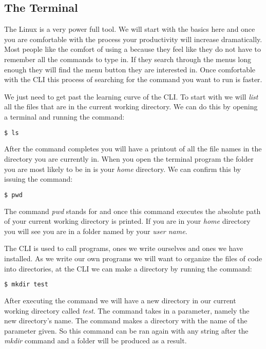 \subsection{The Terminal}
	
The Linux  is a very power full tool. We will start with the basics here and once you are comfortable with the process your productivity will increase dramatically. Most people like the comfort of using a  because they feel like they do not have to remember all the commands to type in. If they search through the menus long enough they will find the menu button they are interested in. Once comfortable with the \ac{CLI} this process of searching for the command you want to run is faster. 

We just need to get past the learning curve of the \ac{CLI}. To start with we will \emph{list} all the files that are in the current working directory. We can do this by opening a terminal and running the command:

\begin{lstlisting}[language=bash]
    $ ls
\end{lstlisting}	
	
After the command completes you will have a printout of all the file names in the directory you are currently in. When you open the terminal program the folder you are most likely to be in is your \emph{home} directory. We can confirm this by issuing the command:

\begin{lstlisting}[language=bash]
    $ pwd
\end{lstlisting}	

The command \emph{pwd} stands for \emph{} and once this command executes the absolute path of your current working directory is printed. If you are in your \emph{home} directory you will see you are in a folder named by your \emph{user name}. 	
	
The \ac{CLI} is used to call programs, ones we write ourselves and ones we have installed. As we write our own programs we will want to organize the files of code into directories, at the \ac{CLI} we can make a directory by running the command:

\begin{lstlisting}[language=bash] 
    $ mkdir test
\end{lstlisting}	

After executing the command we will have a new directory in our current working directory called \emph{test}. The \emph{} command takes in a parameter, namely the new directory's name. The command makes a directory with the name of the parameter given. So this command can be ran again with any string after the \emph{mkdir} command and a folder will be produced as a result. 

